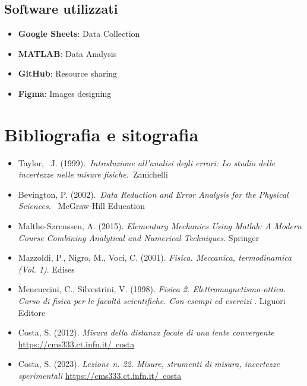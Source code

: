 \documentclass[11pt,a4paper]{article}
\begin{document}
\subsection{Software utilizzati}
\begin{itemize}
    \item \textbf{Google Sheets}: Data Collection
    \item \textbf{MATLAB}: Data Analysis
    \item \textbf{GitHub}: Resource sharing
    \item \textbf{Figma}: Images designing
\end{itemize}

\section{Bibliografia e sitografia}
\begin{itemize}
    \item Taylor,~ J. (1999).~\emph{Introduzione all'analisi degli errori: Lo
  studio delle incertezze nelle misure fisiche.~}Zanichelli
    \item Bevington, P. (2002).~\emph{Data Reduction and Error Analysis for the Physical Sciences.~} McGraw-Hill Education ~
    \item Malthe-Sørenssen, A. (2015). \emph{Elementary Mechanics Using Matlab: A Modern Course Combining Analytical and Numerical Techniques}. Springer
    \item Mazzoldi, P., Nigro, M., Voci, C. (2001). \emph{Fisica. Meccanica, termodinamica (Vol. 1)}. Edises
    \item Mencuccini, C., Silvestrini, V. (1998). \emph{Fisica 2. Elettromagnetismo-ottica. Corso di fisica per le facoltà scientifiche. Con esempi ed esercizi }. Liguori Editore
    \item Costa, S. (2012). \emph{Misura della distanza focale di una lente convergente} \href{https://cms333.ct.infn.it/~costa}{https://cms333.ct.infn.it/~costa}
    \item Costa, S. (2023). \emph{Lezione n. 22. Misure, strumenti di misura, incertezze sperimentali} \href{https://cms333.ct.infn.it/~costa}{https://cms333.ct.infn.it/~costa}
\end{itemize}
\end{document}
